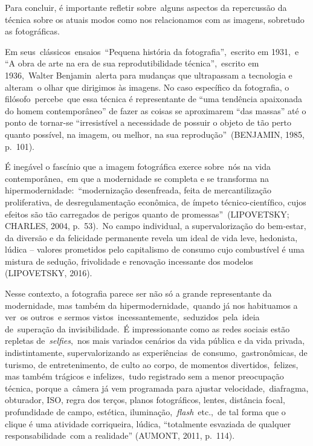 \documentclass[
  letterpaper,
  a4paper,
  12pt]{scrbook}
\begin{document}
Para concluir, é importante refletir sobre~alguns aspectos da
repercussão da técnica sobre os atuais modos como nos relacionamos com
as imagens, sobretudo as fotográficas.~

Em seus~clássicos~ensaios~``Pequena história da fotografia'',~escrito em
1931,~e ``A obra de arte na era de sua reprodutibilidade
técnica'',~escrito em 1936,~Walter Benjamin~alerta para mudanças que
ultrapassam a tecnologia e alteram~o olhar que dirigimos às imagens. No
caso específico da fotografia, o filósofo~percebe~que essa técnica é
representante de ``uma tendência apaixonada do homem contemporâneo'' de
fazer as coisas se aproximarem ``das massas'' até o ponto de tornar-se
``irresistível a necessidade de possuir o objeto de tão perto quanto
possível, na imagem, ou melhor, na sua reprodução''~(BENJAMIN, 1985,
p.~101).~

É inegável o fascínio que a imagem fotográfica exerce sobre~nós na vida
contemporânea,~em que a modernidade se completa e se transforma na
hipermodernidade:~``modernização desenfreada, feita de mercantilização
proliferativa, de desregulamentação econômica, de ímpeto
técnico-científico, cujos efeitos são tão carregados de perigos quanto
de promessas''~(LIPOVETSKY; CHARLES, 2004, p.~53).~No campo individual,
a supervalorização do bem-estar, da diversão e da felicidade permanente
revela um ideal de vida leve, hedonista, lúdica -- valores prometidos
pelo capitalismo de consumo cujo combustível é uma mistura de sedução,
frivolidade e renovação incessante dos modelos (LIPOVETSKY, 2016).~

Nesse contexto, a fotografia parece ser não só a grande representante da
modernidade, mas também da hipermodernidade,~quando já nos habituamos a
ver~os outros~e sermos vistos~incessantemente,~seduzidos~pela~ideia
de~superação da invisibilidade.~É impressionante como as redes sociais
estão repletas de~\emph{selfies},~nos mais variados cenários da vida
pública e da vida privada, indistintamente, supervalorizando as
experiências~de consumo,~gastronômicas, de turismo, de entretenimento,
de culto ao corpo, de momentos divertidos,~felizes, mas também trágicos
e infelizes,~tudo registrado sem a menor preocupação técnica, porque
a~câmera já vem programada para ajustar velocidade,~diafragma,
obturador, ISO, regra dos terços, planos fotográficos, lentes, distância
focal, profundidade de campo, estética,
iluminação,~\emph{flash}~etc.,~de tal forma que o clique é uma atividade
corriqueira, lúdica, ``totalmente esvaziada de qualquer
responsabilidade~com a realidade'' (AUMONT, 2011, p.~114).~
\end{document}

